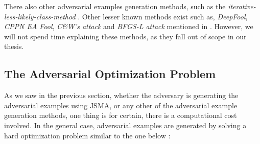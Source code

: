 \documentclass[grad,lot,lof,11pt,oneside,onehalfspace]{RUthesis}
\begin{document}
There also other adversarial examples generation methods, such as the \textit{iterative-less-likely-class-method} \cite{kurakin_adversarial_2017}. Other lesser known methods exist such as, \textit{DeepFool}, \textit{CPPN EA Fool}, \textit{C\&W's attack} and \textit{BFGS-L attack} mentioned in \cite{yuan_adversarial_2017}. However, we will not spend time explaining these methods, as they fall out of scope in our thesis.
\subsection{The Adversarial Optimization Problem}
As we saw in the previous section, whether the adversary is generating the adversarial examples using JSMA, or any other of the adversarial example generation methods, one thing is for certain, there is a computational cost involved. In the general case, adversarial examples are generated by solving a hard optimization problem similar to the one below \cite{papernot_practical_2017}:
\end{document}
